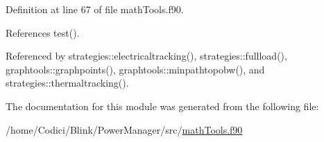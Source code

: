 Definition at line 67 of file math\-Tools.\-f90.



References test().



Referenced by strategies\-::electricaltracking(), strategies\-::fullload(), graphtools\-::graphpoints(), graphtools\-::minpathtopobw(), and strategies\-::thermaltracking().



The documentation for this module was generated from the following file\-:\begin{DoxyCompactItemize}
\item 
/home/\-Codici/\-Blink/\-Power\-Manager/src/\hyperlink{math_tools_8f90}{math\-Tools.\-f90}\end{DoxyCompactItemize}
